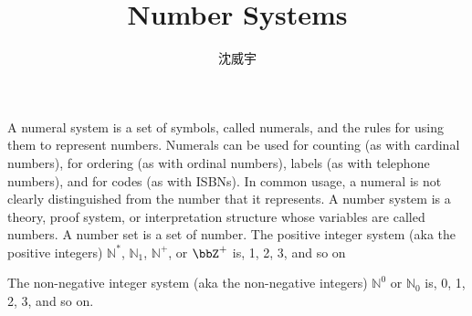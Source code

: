 \documentclass[a4paper,12pt]{article}
\begin{document}
\title{Number Systems}
\author{沈威宇}
\date{\temtoday}
\titletocdoc
{}
A numeral system is a set of symbols, called numerals, and the rules for using them to represent numbers. Numerals can be used for counting (as with cardinal numbers), for ordering (as with ordinal numbers), labels (as with telephone numbers), and for codes (as with ISBNs). In common usage, a numeral is not clearly distinguished from the number that it represents.
A number system is a theory, proof system, or interpretation structure whose variables are called numbers.
A number set is a set of number.
The positive integer system (aka the positive integers) $\mathbb{N}^*$, $\mathbb{N}_1$, $\mathbb{N}^+$, or $\bbZ^+$ is, 1, 2, 3, and so on

The non-negative integer system (aka the non-negative integers) $\mathbb{N}^0$ or $\mathbb{N}_0$ is, 0, 1, 2, 3, and so on.
\end{document}
